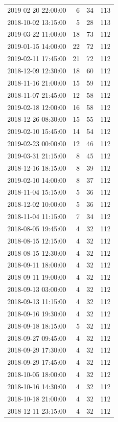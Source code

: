\begin{tabular}{lrrr}
2019-02-20 22:00:00 & 6 & 34 & 113 \\
2018-10-02 13:15:00 & 5 & 28 & 113 \\
2019-03-22 11:00:00 & 18 & 73 & 112 \\
2019-01-15 14:00:00 & 22 & 72 & 112 \\
2019-02-11 17:45:00 & 21 & 72 & 112 \\
2018-12-09 12:30:00 & 18 & 60 & 112 \\
2018-11-16 21:00:00 & 15 & 59 & 112 \\
2018-11-07 21:45:00 & 12 & 58 & 112 \\
2019-02-18 12:00:00 & 16 & 58 & 112 \\
2018-12-26 08:30:00 & 15 & 55 & 112 \\
2019-02-10 15:45:00 & 14 & 54 & 112 \\
2019-02-23 00:00:00 & 12 & 46 & 112 \\
2019-03-31 21:15:00 & 8 & 45 & 112 \\
2018-12-16 18:15:00 & 8 & 39 & 112 \\
2019-02-10 14:00:00 & 8 & 37 & 112 \\
2018-11-04 15:15:00 & 5 & 36 & 112 \\
2018-12-02 10:00:00 & 5 & 36 & 112 \\
2018-11-04 11:15:00 & 7 & 34 & 112 \\
2018-08-05 19:45:00 & 4 & 32 & 112 \\
2018-08-15 12:15:00 & 4 & 32 & 112 \\
2018-08-15 12:30:00 & 4 & 32 & 112 \\
2018-09-11 18:00:00 & 4 & 32 & 112 \\
2018-09-11 19:00:00 & 4 & 32 & 112 \\
2018-09-13 03:00:00 & 4 & 32 & 112 \\
2018-09-13 11:15:00 & 4 & 32 & 112 \\
2018-09-16 19:30:00 & 4 & 32 & 112 \\
2018-09-18 18:15:00 & 5 & 32 & 112 \\
2018-09-27 09:45:00 & 4 & 32 & 112 \\
2018-09-29 17:30:00 & 4 & 32 & 112 \\
2018-09-29 17:45:00 & 4 & 32 & 112 \\
2018-10-05 18:00:00 & 4 & 32 & 112 \\
2018-10-16 14:30:00 & 4 & 32 & 112 \\
2018-10-18 21:00:00 & 4 & 32 & 112 \\
2018-12-11 23:15:00 & 4 & 32 & 112 \\

\end{tabular}

